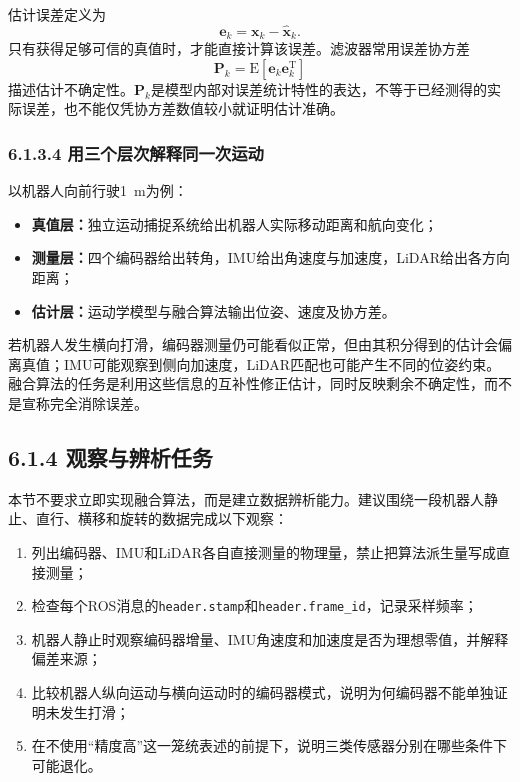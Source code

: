 \documentclass[UTF8,zihao=-4]{ctexart}
\newcommand{\vect}[1]{\bm{#1}}
\begin{document}
估计误差定义为
\begin{equation}
  \vect{e}_k=\vect{x}_k-\hat{\vect{x}}_k.
  \label{eq:estimation-error}
\end{equation}
只有获得足够可信的真值时，才能直接计算该误差。滤波器常用误差协方差
\begin{equation}
  \vect{P}_k=\mathrm{E}\!\left[\vect{e}_k\vect{e}_k^{\mathrm T}\right]
  \label{eq:state-covariance}
\end{equation}
描述估计不确定性。$\vect{P}_k$是模型内部对误差统计特性的表达，不等于已经测得的实际误差，也不能仅凭协方差数值较小就证明估计准确。

\subsubsection*{6.1.3.4 用三个层次解释同一次运动}

以机器人向前行驶\SI{1}{m}为例：
\begin{itemize}
  \item \textbf{真值层：}独立运动捕捉系统给出机器人实际移动距离和航向变化；
  \item \textbf{测量层：}四个编码器给出转角，IMU给出角速度与加速度，LiDAR给出各方向距离；
  \item \textbf{估计层：}运动学模型与融合算法输出位姿、速度及协方差。
\end{itemize}

若机器人发生横向打滑，编码器测量仍可能看似正常，但由其积分得到的估计会偏离真值；IMU可能观察到侧向加速度，LiDAR匹配也可能产生不同的位姿约束。融合算法的任务是利用这些信息的互补性修正估计，同时反映剩余不确定性，而不是宣称完全消除误差。

\subsection*{6.1.4 观察与辨析任务}

本节不要求立即实现融合算法，而是建立数据辨析能力。建议围绕一段机器人静止、直行、横移和旋转的数据完成以下观察：
\begin{enumerate}
  \item 列出编码器、IMU和LiDAR各自直接测量的物理量，禁止把算法派生量写成直接测量；
  \item 检查每个ROS消息的\texttt{header.stamp}和\texttt{header.frame\_id}，记录采样频率；
  \item 机器人静止时观察编码器增量、IMU角速度和加速度是否为理想零值，并解释偏差来源；
  \item 比较机器人纵向运动与横向运动时的编码器模式，说明为何编码器不能单独证明未发生打滑；
  \item 在不使用“精度高”这一笼统表述的前提下，说明三类传感器分别在哪些条件下可能退化。
\end{enumerate}
\end{document}
